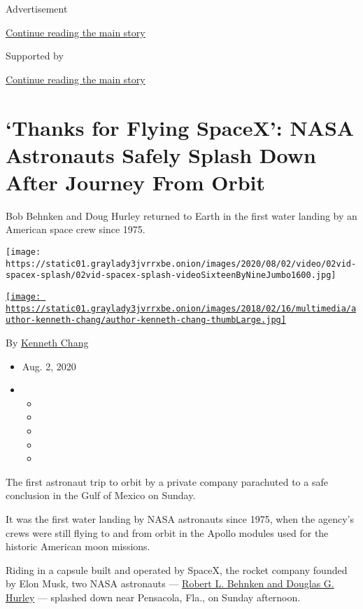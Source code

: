 Advertisement

\protect\hyperlink{after-top}{Continue reading the main story}

Supported by

\protect\hyperlink{after-sponsor}{Continue reading the main story}

\hypertarget{thanks-for-flying-spacex-nasa-astronauts-safely-splash-down-after-journey-from-orbit}{%
\section{`Thanks for Flying SpaceX': NASA Astronauts Safely Splash Down
After Journey From
Orbit}\label{thanks-for-flying-spacex-nasa-astronauts-safely-splash-down-after-journey-from-orbit}}

Bob Behnken and Doug Hurley returned to Earth in the first water landing
by an American space crew since 1975.

\texttt{[image: https://static01.graylady3jvrrxbe.onion/images/2020/08/02/video/02vid-spacex-splash/02vid-spacex-splash-videoSixteenByNineJumbo1600.jpg]}

\href{https://www.nytimes3xbfgragh.onion/by/kenneth-chang}{\texttt{[image: https://static01.graylady3jvrrxbe.onion/images/2018/02/16/multimedia/author-kenneth-chang/author-kenneth-chang-thumbLarge.jpg]}}

By \href{https://www.nytimes3xbfgragh.onion/by/kenneth-chang}{Kenneth
Chang}

\begin{itemize}
\item
  Aug. 2, 2020
\item
  \begin{itemize}
  \item
  \item
  \item
  \item
  \item
  \end{itemize}
\end{itemize}

The first astronaut trip to orbit by a private company parachuted to a
safe conclusion in the Gulf of Mexico on Sunday.

It was the first water landing by NASA astronauts since 1975, when the
agency's crews were still flying to and from orbit in the Apollo modules
used for the historic American moon missions.

Riding in a capsule built and operated by SpaceX, the rocket company
founded by Elon Musk, two NASA astronauts ---
\href{https://www.nytimes3xbfgragh.onion/2020/05/27/science/bob-behnken-doug-hurley.html}{Robert
L. Behnken and Douglas G. Hurley} --- splashed down near Pensacola,
Fla., on Sunday afternoon.


